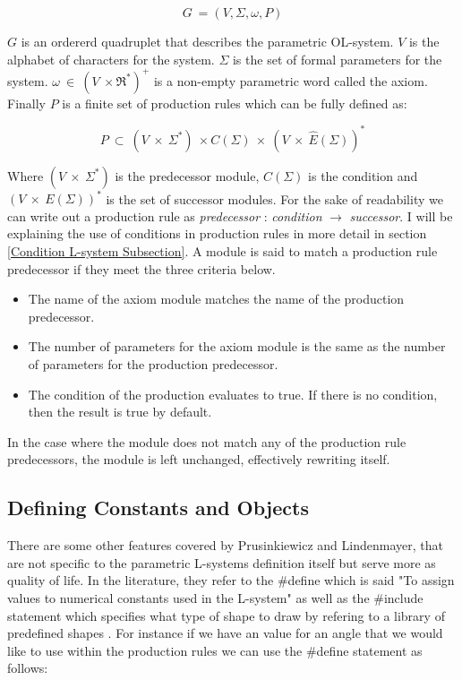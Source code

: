 \begin{equation}
G~ = (V, \Sigma, \omega, P)
\end{equation}
\vspace{5mm}

\noindent
$G$ is an ordererd quadruplet that describes the parametric OL-system. $V$ is the alphabet of characters for the system. $\Sigma$ is the set of formal parameters for the system. $\omega~ \in~ (V~ \times \Re^*)^+$ is a non-empty parametric word called the axiom. Finally $P$ is a finite set of production rules which can be fully defined as:

\begin{equation}
P~ \subset~ (V~ \times~ \Sigma^*)~ \times C(\Sigma)~ \times~ (V~ \times~ \hat{E}(\Sigma))^*
\end{equation}

\noindent
Where $(V~ \times~ \Sigma^*) $ is the predecessor module, $C(\Sigma) $ is the condition and $(V~ \times~ E(\Sigma))^* $ is the set of successor modules. For the sake of readability we can write out a production rule as \textit{predecessor} : \textit{condition} $\rightarrow$ \textit{successor}. I will be explaining the use of conditions in production rules in more detail in section \ref{Condition L-system Subsection}.
A module is said to match a production rule predecessor if they meet the three criteria below.

\begin{itemize}
\item The name of the axiom module matches the name of the production predecessor.
\item The number of parameters for the axiom module is the same as the number of parameters for the production predecessor.
\item The condition of the production evaluates to true. If there is no condition, then the result is true by default.
\end{itemize}

\noindent
In the case where the module does not match any of the production rule predecessors, the module is left unchanged, effectively rewriting itself. 


\subsection{Defining Constants and Objects}

There are some other features covered by Prusinkiewicz and Lindenmayer, that are not specific to the parametric L-systems definition itself but serve more as quality of life. In the literature, they refer to the \#define which is said "To assign values to numerical constants used in the L-system" as well as the \#include statement which specifies what type of shape to draw by refering to a library of predefined shapes \cite{prusinkiewicz2012algorithmic}.
\noindent
For instance if we have an value for an angle that we would like to use within the production rules we can use the \#define statement as follows:

